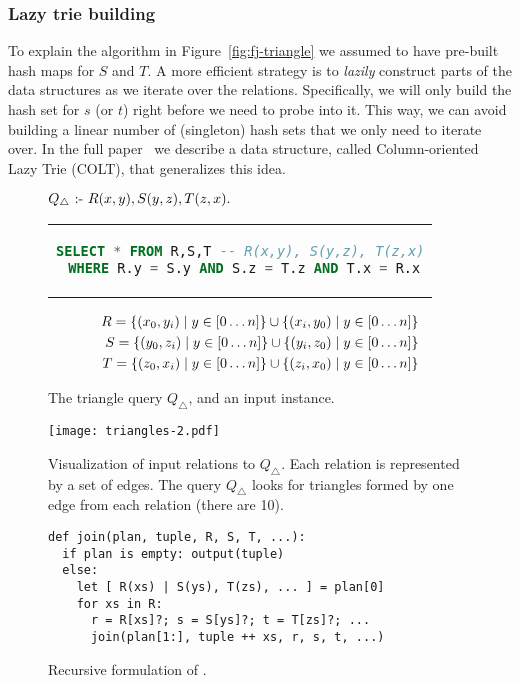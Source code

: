 \subsubsection{Lazy trie building}
To explain the algorithm in Figure~\ref{fig:fj-triangle} we assumed
to have pre-built hash maps for $S$ and $T$.
A more efficient strategy is to {\em lazily} construct parts of the data structures
as we iterate over the relations.
Specifically, we will only build the hash set for $s$ (or $t$)
right before we need to probe into it.
This way, we can avoid building a linear number of (singleton) hash sets
that we only need to iterate over.
In the full paper~\cite{10.1145/3589295} we describe a data structure,
called Column-oriented Lazy Trie (COLT), that generalizes this idea.

\begin{figure}
  $Q_\triangle \text{ :- } R(x, y), S(y, z), T(z, x).$
  \begin{center}
    \begin{tabular}{c}
      \begin{lstlisting}[language=SQL, numbers=none]
SELECT * FROM R,S,T -- R(x,y), S(y,z), T(z,x)
 WHERE R.y = S.y AND S.z = T.z AND T.x = R.x
\end{lstlisting}
    \end{tabular}
  \end{center}
  \begin{align*}
    R  = \{{(x_0, y_i)}\mid{y \in [0 \ldots n]}\} \cup \{{(x_i, y_0)}\mid{y \in [0 \ldots n]}\} \\
    S  = \{{(y_0, z_i)}\mid{y \in [0 \ldots n]}\} \cup \{{(y_i, z_0)}\mid{y \in [0 \ldots n]}\} \\
    T  = \{{(z_0, x_i)}\mid{y \in [0 \ldots n]}\} \cup \{{(z_i, x_0)}\mid{y \in [0 \ldots n]}\}
  \end{align*}
  \caption{The triangle query $Q_\triangle$, and an input instance.}
  \label{fig:triangle-query}
\end{figure}

\begin{figure}
  \texttt{[image: triangles-2.pdf]}
  \caption{Visualization of input relations to $Q_\triangle$.
    Each relation is represented by a set of edges.
    The query $Q_\triangle$ looks for triangles formed by
    one edge from each relation (there are 10).}
  \label{fig:triangle-input}
\end{figure}

\begin{figure}
  \begin{lstlisting}
def join(plan, tuple, R, S, T, ...):
  if plan is empty: output(tuple)
  else:
    let [ R(xs) | S(ys), T(zs), ... ] = plan[0]
    for xs in R:
      r = R[xs]?; s = S[ys]?; t = T[zs]?; ...
      join(plan[1:], tuple ++ xs, r, s, t, ...)
\end{lstlisting}
  \caption{Recursive formulation of \FJ.}
  \label{fig:fj-recursive}
\end{figure}


